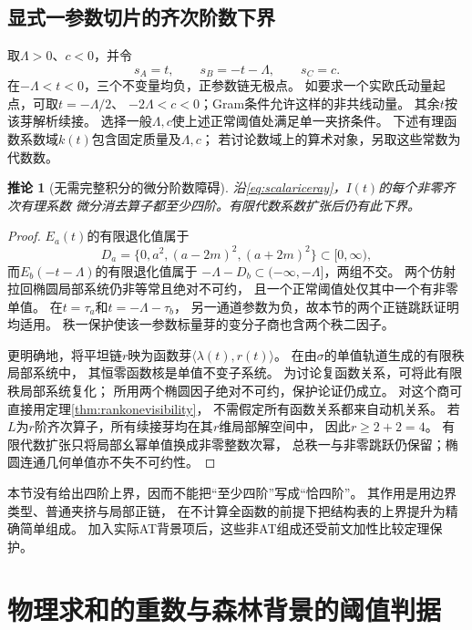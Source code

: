 \documentclass[11pt,a4paper]{ctexart}
\theoremstyle{cnplain}\newtheorem{theorem}{定理}[section]
\newtheorem{corollary}[theorem]{推论}
\theoremstyle{definition}\newtheorem{definition}[theorem]{定义}
\theoremstyle{remark}\newtheorem{remark}[theorem]{注}
\begin{document}
\subsection{显式一参数切片的齐次阶数下界}
取$\Lambda>0$、$c<0$，并令
\begin{equation}\label{eq:scalariceray}
 s_A=t,\qquad s_B=-t-\Lambda,\qquad s_C=c.
\end{equation}
在$-\Lambda<t<0$，三个不变量均负，正参数链无极点。
如要求一个实欧氏动量起点，可取$t=-\Lambda/2$、
$-2\Lambda<c<0$；Gram条件允许这样的非共线动量。
其余$t$按该芽解析续接。
选择一般$\Lambda,c$使上述正常阈值处满足单一夹挤条件。
下述有理函数系数域$k(t)$包含固定质量及$\Lambda,c$；
若讨论数域上的算术对象，另取这些常数为代数数。

\begin{corollary}[无需完整积分的微分阶数障碍]\label{cor:scalariceorder}
沿\eqref{eq:scalariceray}，$I(t)$的每个非零齐次有理系数
微分消去算子都至少四阶。有限代数系数扩张后仍有此下界。
\end{corollary}
\begin{proof}
$E_a(t)$的有限退化值属于
\[
 D_a=\{0,a^2,(a-2m)^2,(a+2m)^2\}\subset[0,\infty),
\]
而$E_b(-t-\Lambda)$的有限退化值属于
$-\Lambda-D_b\subset(-\infty,-\Lambda]$，两组不交。
两个仿射拉回椭圆局部系统仍非等常且绝对不可约，
且一个正常阈值处仅其中一个有非零单值。
在$t=\tau_a$和$t=-\Lambda-\tau_b$，
另一通道参数为负，故本节的两个正链跳跃证明均适用。
秩一保护使该一参数标量芽的变分子商也含两个秩二因子。

更明确地，将平坦链$r$映为函数芽$\langle\lambda(t),r(t)\rangle$。
在由$\sigma$的单值轨道生成的有限秩局部系统中，
其恒零函数核是单值不变子系统。
为讨论复函数关系，可将此有限秩局部系统复化；
所用两个椭圆因子绝对不可约，保护论证仍成立。
对这个商可直接用定理\ref{thm:rankonevisibility}，
不需假定所有函数关系都来自动机关系。
若$L$为$r$阶齐次算子，所有续接芽均在其$r$维局部解空间中，
因此$r\geq2+2=4$。
有限代数扩张只将局部幺幂单值换成非零整数次幂，
总秩一与非零跳跃仍保留；椭圆连通几何单值亦不失不可约性。
\end{proof}

本节没有给出四阶上界，因而不能把“至少四阶”写成“恰四阶”。
其作用是用边界类型、普通夹挤与局部正链，
在不计算全函数的前提下把结构表的上界提升为精确简单组成。
加入实际AT背景项后，这些非AT组成还受前文加性比较定理保护。


\section{物理求和的重数与森林背景的阈值判据}\label{sec:physicalsum}
\end{document}
